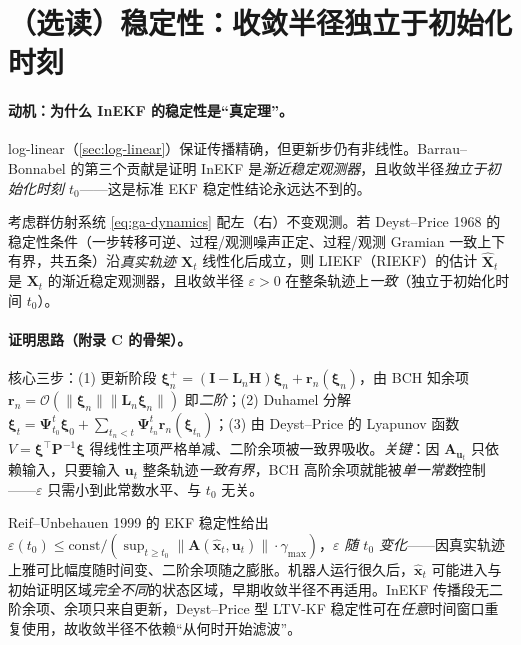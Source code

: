 \section{（选读）稳定性：收敛半径独立于初始化时刻}
\label{sec:stability}

\paragraph{动机：为什么 InEKF 的稳定性是“真定理”。}
log-linear（\cref{sec:log-linear}）保证传播精确，但更新步仍有非线性。Barrau--Bonnabel 的第三个贡献是证明 InEKF 是\emph{渐近稳定观测器}，且收敛半径\emph{独立于初始化时刻 $t_0$}——这是标准 EKF 稳定性结论永远达不到的。

\begin{theorem}\label{thm:inekf-stable}
考虑群仿射系统 \cref{eq:ga-dynamics} 配左（右）不变观测。若 Deyst--Price 1968 的稳定性条件（一步转移可逆、过程/观测噪声正定、过程/观测 Gramian 一致上下有界，共五条）沿\emph{真实轨迹 $\mathbf{X}_t$} 线性化后成立，则 LIEKF（RIEKF）的估计 $\hat{\mathbf{X}}_t$ 是 $\mathbf{X}_t$ 的渐近稳定观测器，且收敛半径 $\varepsilon>0$ 在整条轨迹上\emph{一致}（独立于初始化时间 $t_0$）。
\end{theorem}

\paragraph{证明思路（附录 C 的骨架）。}核心三步\cite{barrau2017invariant}：(1) 更新阶段 $\boldsymbol{\xi}^+_n=(\mathbf{I}-\mathbf{L}_n\mathbf{H})\boldsymbol{\xi}_n+\mathbf{r}_n(\boldsymbol{\xi}_n)$，由 BCH 知余项 $\mathbf{r}_n=\mathcal{O}(\|\boldsymbol{\xi}_n\|\|\mathbf{L}_n\boldsymbol{\xi}_n\|)$ 即\emph{二阶}；(2) Duhamel 分解 $\boldsymbol{\xi}_t=\boldsymbol{\Psi}^t_{t_0}\boldsymbol{\xi}_0+\sum_{t_n<t}\boldsymbol{\Psi}^t_{t_n}\mathbf{r}_n(\boldsymbol{\xi}_{t_n})$；(3) 由 Deyst--Price 的 Lyapunov 函数 $V=\boldsymbol{\xi}^\top\mathbf{P}^{-1}\boldsymbol{\xi}$ 得线性主项严格单减、二阶余项被一致界吸收。\emph{关键}：因 $\mathbf{A}_{\mathbf{u}_t}$ 只依赖输入，只要输入 $\mathbf{u}_t$ 整条轨迹\emph{一致有界}，BCH 高阶余项就能被\emph{单一常数}控制——$\varepsilon$ 只需小到此常数水平、与 $t_0$ 无关。

\begin{insight}
Reif--Unbehauen 1999 的 EKF 稳定性给出 $\varepsilon(t_0)\le\text{const}/(\sup_{t\ge t_0}\|\mathbf{A}(\hat{\mathbf{x}}_t,\mathbf{u}_t)\|\cdot\gamma_{\max})$，$\varepsilon$ \emph{随 $t_0$ 变化}——因真实轨迹上雅可比幅度随时间变、二阶余项随之膨胀。机器人运行很久后，$\hat{\mathbf{x}}_t$ 可能进入与初始证明区域\emph{完全不同}的状态区域，早期收敛半径不再适用。InEKF 传播段无二阶余项、余项只来自更新，Deyst--Price 型 LTV-KF 稳定性可在\emph{任意}时间窗口重复使用，故收敛半径不依赖“从何时开始滤波”。
\end{insight}


